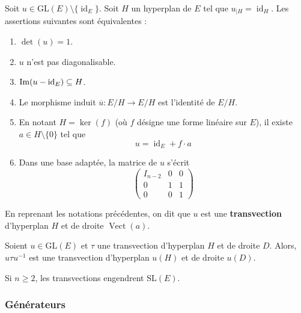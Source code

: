 
  \begin{proposition}
    Soit $u \in \mathrm{GL}(E) \setminus \{ \operatorname{id}_E \}$. Soit $H$ un hyperplan de $E$ tel que $u_{|H} = \operatorname{id}_H$. Les assertions suivantes sont équivalentes :
    \begin{enumerate}[label=(\roman*)]
      \item $\det(u) = 1$.
      \item $u$ n'est pas diagonalisable.
      \item $\mathrm{Im}(u - \operatorname{id}_E) \subseteq H$.
      \item Le morphisme induit $\overline{u} : E/H \rightarrow E/H$ est l'identité de $E/H$.
      \item En notant $H = \ker(f)$ (où $f$ désigne une forme linéaire sur $E$), il existe $a \in H \setminus \{ 0 \}$ tel que
      \[ u = \operatorname{id}_E + f \cdot a \]
      \item Dans une base adaptée, la matrice de $u$ s'écrit
      \[
      \begin{pmatrix}
        I_{n-2} & 0 & 0 \\
        0 & 1 & 1 \\
        0 & 0 & 1
      \end{pmatrix}
      \]
    \end{enumerate}
  \end{proposition}

  \begin{definition}
    En reprenant les notations précédentes, on dit que $u$ est une \textbf{transvection} d'hyperplan $H$ et de droite $\operatorname{Vect}(a)$.
  \end{definition}

  \begin{proposition}
    Soient $u \in \mathrm{GL}(E)$ et $\tau$ une transvection d'hyperplan $H$ et de droite $D$. Alors, $u \tau u^{-1}$ est une transvection d'hyperplan $u(H)$ et de droite $u(D)$.
  \end{proposition}

  \begin{theorem}
    Si $n \geq 2$, les transvections engendrent $\mathrm{SL}(E)$.
  \end{theorem}

  \subsubsection{Générateurs}

